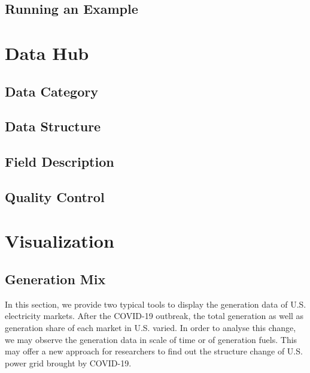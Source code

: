 \documentclass[11pt]{article}
\numberwithin{equation}{section}
\numberwithin{table}{section}
\numberwithin{figure}{section}
\begin{document}
\clearpage
\subsection{Running an Example}





\newpage
\section{Data Hub} \label{sec:datahub}

\subsection{Data Category}

\subsection{Data Structure}

\subsection{Field Description}

\subsection{Quality Control}








\newpage
\section{Visualization} \label{sec:visual}

\subsection{Generation Mix}

In this section, we provide two typical tools to display the generation data of U.S. electricity markets. After the COVID-19 outbreak, the total generation as well as generation share of each market in U.S. varied. In order to analyse this change, we may observe the generation data in scale of time or of generation fuels. This may offer a new approach for researchers to find out the structure change of U.S. power grid brought by COVID-19.
\end{document}
